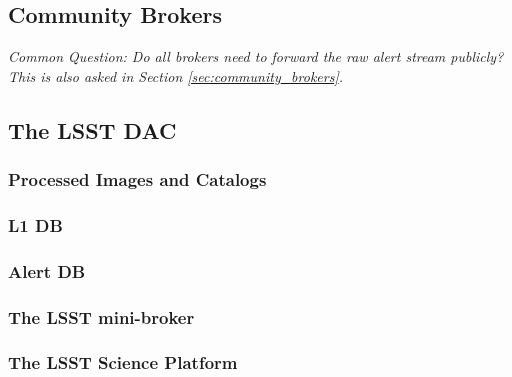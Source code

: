 \subsection{Community Brokers}

{\it Common Question: Do all brokers need to forward the raw alert stream publicly? This is also asked in Section \ref{sec:community_brokers}.}


\subsection{The LSST DAC}

\subsubsection{Processed Images and Catalogs}

\subsubsection{L1 DB}

\subsubsection{Alert DB}

\subsubsection{The LSST mini-broker}

\subsubsection{The LSST Science Platform}
